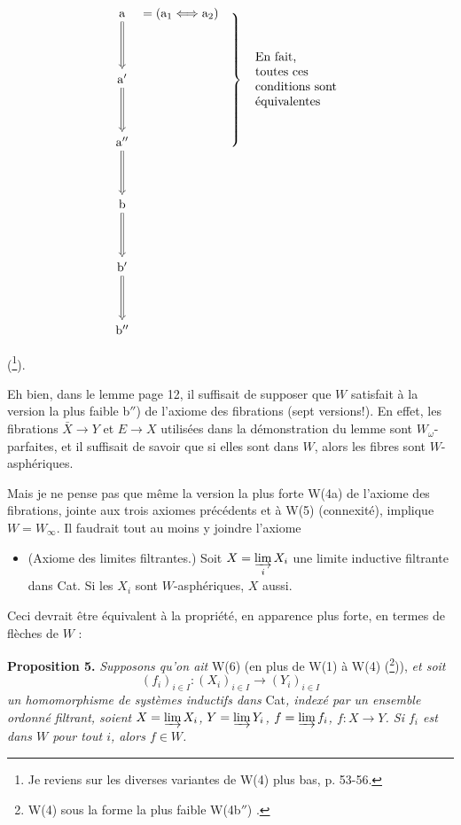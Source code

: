 \documentclass[11pt]{article}
\newcommand{\printedpage}[1]{\marginpar{\footnotesize p.~#1}}
\newcommand{\msp}[1]{\marginpar{\footnotesize [#1]}}
\begin{document}
\[
\begin{tikzcd}[row sep=huge, column sep=0pt]
\mathrm{a} \arrow[d, Rightarrow] & {}= (\mathrm{a}_1 \Longleftrightarrow \mathrm{a}_2) & \hspace{2.5cm} \\
\mathrm{a}' \arrow[d, Rightarrow] & & \smash{\left.\rule[-1.8cm]{0pt}{3.6cm}\right\}\ \text{\begin{tabular}{l}En fait,\\ toutes ces\\ conditions sont\\ équivalentes\end{tabular}}} \\
\mathrm{a}'' \arrow[d, Rightarrow] & & \\
\mathrm{b} \arrow[d, Rightarrow] & & \\
\mathrm{b}' \arrow[d, Rightarrow] & & \\
\mathrm{b}'' & &
\end{tikzcd}
\]

(\footnote[33]{Je reviens sur les diverses variantes de W(4) plus bas, p. 53-56.}).

Eh bien, dans le lemme page 12, il suffisait de supposer que $W$ satisfait à la version la plus faible b$''$) de l'axiome des fibrations (sept versions!). En effet, les fibrations $\bar{X} \longrightarrow Y$ et $E \longrightarrow X$ utilisées dans la démonstration du lemme sont $W_\omega$-parfaites, et il suffisait de savoir que si elles sont dans $W$, alors les fibres sont $W$-asphériques.

Mais je ne pense pas que même la version la plus forte W(4a) de l'axiome des fibrations, jointe aux trois axiomes précédents et à W(5) (connexité), implique $W = W_\infty$. Il faudrait tout au moins y joindre l'axiome

\begin{itemize}[leftmargin=4em, labelwidth=3em, labelsep=0.6em]
\item[\textbf{W(6)}] (Axiome des limites filtrantes.) Soit $X = \varinjlim\limits_{i} X_i$ une limite inductive filtrante dans Cat. Si les $X_i$ sont $W$-asphériques, $X$ aussi.
\end{itemize}

Ceci devrait être équivalent à la propriété, en apparence plus forte, en termes de flèches de $W$ :

\textbf{Proposition 5.} \textit{Supposons qu'on ait} W(6) (en plus de W(1) à W(4) (\footnote[34]{W(4) sous la forme la plus faible W(4b$''$) .})),
\msp{page 15}\textit{et soit}
\[ (f_i)_{i\in I} : (X_i)_{i\in I} \longrightarrow (Y_i)_{i\in I} \]
\printedpage{13}
\textit{un homomorphisme de systèmes inductifs dans} Cat\textit{, indexé par un ensemble ordonné filtrant, soient $X = \varinjlim X_i$, $Y = \varinjlim Y_i$, $f = \varinjlim f_i$, $f : X \longrightarrow Y$. Si $f_i$ est dans $W$ pour tout $i$, alors $f \in W$.}
\end{document}
